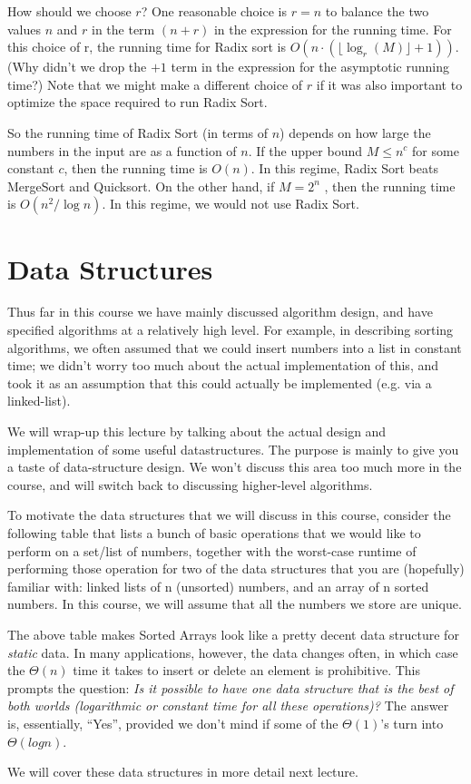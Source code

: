 \documentclass [12pt]{article}
\begin{document}
How should we choose $r$? One reasonable choice is $r = n$ to balance the two values $n$ and $r$ in the term $(n +r)$ in the expression for the running time. For this choice of r, the running time for Radix sort is $O(n \cdot (\lfloor\log_r (M)\rfloor + 1))$. (Why didn’t we drop the $+1$ term in the expression
for the asymptotic running time?) Note that we might make a different choice of $r$ if it was also important to optimize the space required to run Radix Sort.

So the running time of Radix Sort (in terms of $n$) depends on how large the numbers in the input are as a function of $n$. If the upper bound $M \leq n^c$ for some constant $c$, then the running time is $O(n)$. In this regime, Radix Sort beats MergeSort and Quicksort. On the other hand, if $M = 2^n$ , then the running time is $O(n^2/\log n)$. In this regime, we would not use Radix Sort.


\section{Data Structures}

Thus far in this course we have mainly discussed algorithm design, and have specified algorithms at a relatively high level. For example, in describing sorting algorithms, we often assumed that we could insert numbers into a list in constant time; we didn’t worry too much about the actual implementation of this, and took it as an assumption that this could actually be implemented (e.g. via a linked-list).


We will wrap-up this lecture by talking about the actual design and implementation of some useful datastructures. The purpose is mainly to give you a taste of data-structure design. We won’t discuss this area too much more in the course, and will switch back to discussing higher-level algorithms. 

To motivate the data structures that we will discuss in this course, consider the following table that lists a bunch of basic operations that we would like to perform on a set/list of
numbers, together with the worst-case runtime of performing those operation for two of the data structures that you are (hopefully) familiar with: linked lists of n (unsorted) numbers,
and an array of n sorted numbers. In this course, we will assume that all the numbers we store are unique.


The above table makes Sorted Arrays look like a pretty decent data structure for \textit{static} data. In many applications, however, the data changes often, in which case the $\Theta(n)$ time it takes to insert or delete an element is prohibitive. This prompts the question: \textit{Is it possible to have one data structure that is the best of both worlds (logarithmic or constant time for all these operations)?} The answer is, essentially, ``Yes'', provided we don’t mind if some of the $\Theta(1)$’s turn into $\Theta(log n)$. 

We will cover these data structures in more detail next lecture.
\end{document}
